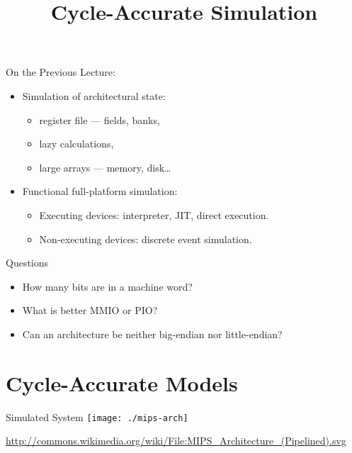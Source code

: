 
\title{Cycle-Accurate Simulation}

%



\startslides

\begin{frame}{On the Previous Lecture:}
\begin{itemize}
\item Simulation of architectural state:
  \begin{itemize}
  \item register file --- fields, banks,
  \item lazy calculations,
  \item large arrays --- memory, disk\dots
  \end{itemize}
\item Functional full-platform simulation:
  \begin{itemize}
  \item Executing devices: interpreter, JIT, direct execution.
  \item Non-executing devices: discrete event simulation.
  \end{itemize}
\end{itemize}
\end{frame}

\begin{frame}{Questions}
\begin{itemize}
\item How many bits are in a machine word?\pause
\item What is better MMIO or PIO?\pause
\item Can an architecture be neither big-endian nor little-endian?\pause
\end{itemize}
\end{frame}

\section{Cycle-Accurate Models}

\begin{frame}{Simulated System}
\centering
\texttt{[image: ./mips-arch]}

\tiny{\url{http://commons.wikimedia.org/wiki/File:MIPS_Architecture_(Pipelined).svg}}
\end{frame}

